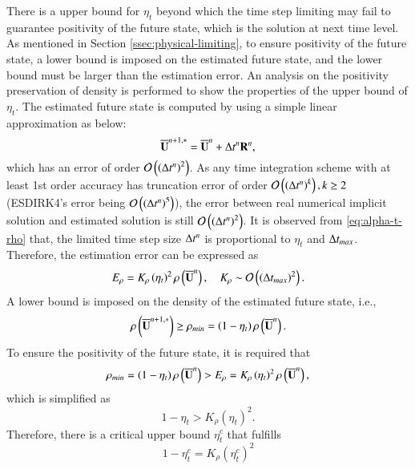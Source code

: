 There is a upper bound for $\eta_t$ beyond which the time step limiting may fail to guarantee positivity of the future state, which is the solution at next time level. As mentioned in Section \ref{ssec:physical-limiting}, to ensure positivity of the future state, a lower bound is imposed on the estimated future state, and the lower bound must be larger than the estimation error. An analysis on the positivity preservation of density is performed to show the properties of the upper bound of $\eta_t$. The estimated future state is computed by using a simple linear approximation as below:
\begin{equation} 
    \overline{\mathbf{U}}^{n+1,*}=\overline{\mathbf{U}}^n + \mathrm\Delta t^n \mathbf{R}^n,
\end{equation}
which has an error of order $\mathcal{O}\left(\left(\mathrm\Delta t^n\right)^2\right)$.
As any time integration scheme with at least 
1st order accuracy has truncation error 
of order $\mathcal{O}\left(\left(\mathrm\Delta t^n\right)^k\right),k\geq2$
(ESDIRK4's error being $\mathcal{O}\left(\left(\mathrm\Delta t^n\right)^5\right)$),
the error between real numerical implicit solution and estimated
solution is still $\mathcal{O}\left(\left(\mathrm\Delta t^n\right)^2\right)$.
It is observed from \eqref{eq:alpha-t-rho} that, the limited time step size $\mathrm\Delta t^n$ is proportional to $\eta_t$ and $\mathrm\Delta t_{max}$. Therefore, the estimation error can be expressed as
\begin{equation}
    E_\rho= K_\rho \left(\eta_t\right)^2 \rho\left(\overline{\mathbf{U}}^n\right) , \quad K_\rho \sim \mathcal{O}\left(\left(\mathrm\Delta t_{max}\right)^2\right).
\end{equation}
A lower bound is imposed on the density of the estimated future state, i.e.,
\begin{equation}
    \rho\left(\overline{\mathbf{U}}^{n+1,*}\right) \geq \rho_{min}= \left(1-\eta_t\right) \rho\left(\overline{\mathbf{U}}^n\right).
\end{equation}
To ensure the positivity of the future state, it is required that
\begin{equation}
    \rho_{min}= \left(1-\eta_t\right) \rho\left(\overline{\mathbf{U}}^n\right) > E_\rho= K_\rho \left(\eta_t\right)^2 \rho\left(\overline{\mathbf{U}}^n\right),
\end{equation}
which is simplified as 
\begin{equation}
    1-\eta_t > K_\rho \left(\eta_t\right)^2.
\end{equation}
Therefore, there is a critical upper bound $\eta^c_t$ that fulfills 
\begin{equation}
    1-\eta^c_t = K_\rho \left(\eta^c_t\right)^2
\end{equation}
